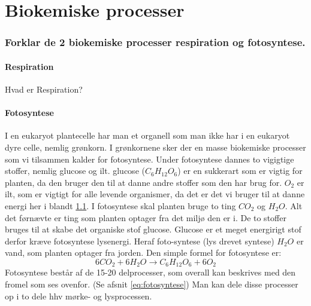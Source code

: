 \newpage
\part{Biokemiske processer}
    \section{Forklar de 2 biokemiske processer respiration og fotosyntese.}
        \subsection{Respiration}\label{sec:respiration}
            Hvad er Respiration? 
        \subsection{Fotosyntese}
            I en eukaryot plantecelle har man et organell som man ikke har i en eukaryot dyre celle, nemlig grønkorn. I grønkornene sker der en masse biokemiske processer som vi tilsammen kalder for fotosyntese. Under fotosyntese dannes to vigigtige stoffer, nemlig glucose og ilt. glucose (\begin{math}C_6H_{12}O_6\end{math}) er en sukkerart som er vigtig for planten, da den bruger den til at danne andre stoffer som den har brug for. 
            \begin{math}O_2\end{math} er ilt, som er vigtigt for alle levende organismer, da det er det vi bruger til at danne energi her i blandt \ref{sec:respiration}.
            I fotosyntese skal planten bruge to ting \begin{math}CO_2\end{math} og \begin{math}H_2O\end{math}. Alt det førnævte er ting som planten optager fra det miljø den er i. De to stoffer bruges til at skabe det organiske stof glucose. Glucose er et meget energirigt stof derfor kræve fotosyntese lysenergi. Heraf foto-syntese (lys drevet syntese)  \begin{math}H_2O\end{math} er vand, som planten optager fra jorden.
            Den simple formel for fotosyntese er: \begin{equation} 6CO_2 + 6H_2O \rightarrow C_6H_{12}O_6 + 6O_2 \end{equation}\label{eq:fotosyntese}
            Fotosyntese består af de 15-20 delprocesser, som overall kan beskrives med den fromel som ses ovenfor. (Se afsnit \ref{eq:fotosyntese})
            Man kan dele disse processer op i to dele hhv mørke- og lysprocessen. \newline 
